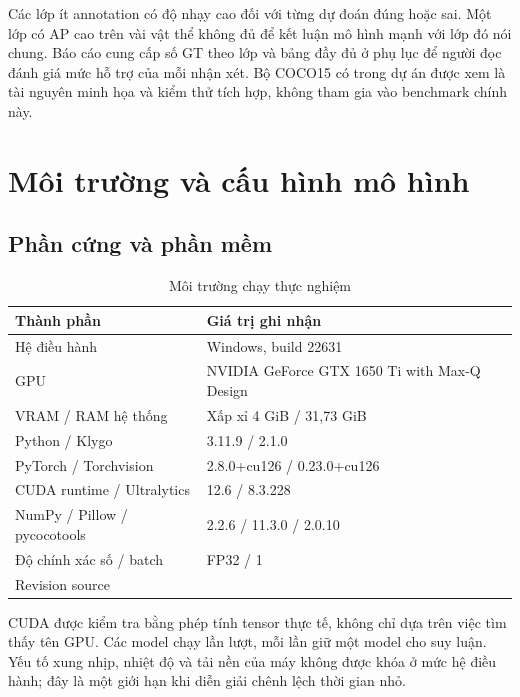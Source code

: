 Các lớp ít annotation có độ nhạy cao đối với từng dự đoán đúng hoặc sai. Một lớp có AP cao trên vài vật thể không đủ để kết luận mô hình mạnh với lớp đó nói chung. Báo cáo cung cấp số GT theo lớp và bảng đầy đủ ở phụ lục để người đọc đánh giá mức hỗ trợ của mỗi nhận xét. Bộ COCO15 có trong dự án được xem là tài nguyên minh họa và kiểm thử tích hợp, không tham gia vào benchmark chính này.

\section{Môi trường và cấu hình mô hình}
\subsection{Phần cứng và phần mềm}
\begin{table}[H]\centering\small
\caption{Môi trường chạy thực nghiệm}
\begin{tabularx}{\textwidth}{p{5.1cm}Y}
\toprule Thành phần & Giá trị ghi nhận \\\midrule
Hệ điều hành & Windows, build 22631 \\
GPU & NVIDIA GeForce GTX 1650 Ti with Max-Q Design \\
VRAM / RAM hệ thống & Xấp xỉ 4 GiB / 31,73 GiB \\
Python / Klygo & 3.11.9 / 2.1.0 \\
PyTorch / Torchvision & 2.8.0+cu126 / 0.23.0+cu126 \\
CUDA runtime / Ultralytics & 12.6 / 8.3.228 \\
NumPy / Pillow / pycocotools & 2.2.6 / 11.3.0 / 2.0.10 \\
Độ chính xác số / batch & FP32 / 1 \\
Revision source &  \\
\bottomrule
\end{tabularx}
\end{table}
CUDA được kiểm tra bằng phép tính tensor thực tế, không chỉ dựa trên việc tìm thấy tên GPU. Các model chạy lần lượt, mỗi lần giữ một model cho suy luận. Yếu tố xung nhịp, nhiệt độ và tải nền của máy không được khóa ở mức hệ điều hành; đây là một giới hạn khi diễn giải chênh lệch thời gian nhỏ.


